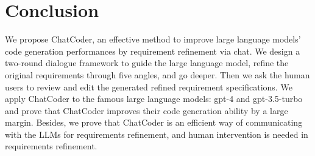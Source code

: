 \documentclass[sigconf]{acmart}
\begin{document}
\section{Conclusion}
We propose ChatCoder, an effective method to improve large language models' code generation performances by requirement refinement via chat. We design a two-round dialogue framework to guide the large language model, refine the original requirements through five angles, and go deeper. Then we ask the human users to review and edit the generated refined requirement specifications. We apply ChatCoder to the famous large language models: gpt-4 and gpt-3.5-turbo and prove that ChatCoder improves their code generation ability by a large margin. Besides, we prove that ChatCoder is an efficient way of communicating with the LLMs for requirements refinement, and human intervention is needed in requirements refinement.


\end{document}
